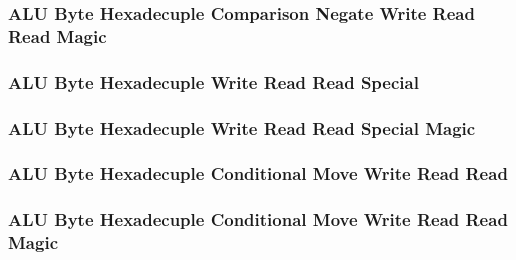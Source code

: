 

\subsubsection[{\small ALU Byte Hexadecuple Comparison Negate Write Read Read Magic}]{ALU Byte Hexadecuple Comparison Negate Write Read Read Magic} \label{sec:format-ALU-BXCNWRR.M}



\subsubsection[{\small ALU Byte Hexadecuple Write Read Read Special}]{ALU Byte Hexadecuple Write Read Read Special} \label{sec:format-ALU-BXWRRS}



\subsubsection[{\small ALU Byte Hexadecuple Write Read Read Special Magic}]{ALU Byte Hexadecuple Write Read Read Special Magic} \label{sec:format-ALU-BXWRRS.M}



\subsubsection[{\small ALU Byte Hexadecuple Conditional Move Write Read Read}]{ALU Byte Hexadecuple Conditional Move Write Read Read} \label{sec:format-ALU-BXCMWRR}



\subsubsection[{\small ALU Byte Hexadecuple Conditional Move Write Read Read Magic}]{ALU Byte Hexadecuple Conditional Move Write Read Read Magic} \label{sec:format-ALU-BXCMWRR.M}

